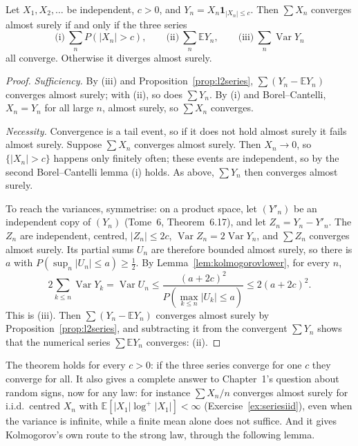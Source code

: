\begin{theorem}\label{thm:threeseries}
Let $X_1,X_2,\dots$ be independent, $c>0$, and $Y_n=X_n\mathbf 1_{|X_n|\le c}$. Then $\sum X_n$ converges almost surely if and only if the three
series
\[
\text{(i)}\ \sum_nP(|X_n|>c),\qquad\text{(ii)}\ \sum_n\mathbb E Y_n,\qquad\text{(iii)}\ \sum_n\operatorname{Var}Y_n
\]
all converge. Otherwise it diverges almost surely.
\end{theorem}
\begin{proof}
\emph{Sufficiency.} By (iii) and Proposition~\ref{prop:l2series}, $\sum(Y_n-\mathbb E Y_n)$ converges almost surely; with (ii), so does $\sum Y_n$.
By (i) and Borel--Cantelli, $X_n=Y_n$ for all large $n$, almost surely, so $\sum X_n$ converges.

\emph{Necessity.} Convergence is a tail event, so if it does not hold almost surely it fails almost surely. Suppose $\sum X_n$ converges almost surely.
Then $X_n\to0$, so $\{|X_n|>c\}$ happens only finitely often; these events are independent, so by the second Borel--Cantelli lemma (i) holds. As above,
$\sum Y_n$ then converges almost surely.

To reach the variances, symmetrise: on a product space, let $(Y'_n)$ be an independent copy of $(Y_n)$ (Tome~6, Theorem~6.17), and let
$Z_n=Y_n-Y'_n$. The $Z_n$ are independent, centred, $|Z_n|\le2c$, $\operatorname{Var}Z_n=2\operatorname{Var}Y_n$, and $\sum Z_n$ converges almost
surely. Its partial sums $U_n$ are therefore bounded almost surely, so there is $a$ with $P(\sup_n|U_n|\le a)\ge\frac12$. By
Lemma~\ref{lem:kolmogorovlower}, for every $n$,
\[
2\sum_{k\le n}\operatorname{Var}Y_k=\operatorname{Var}U_n\le\frac{(a+2c)^2}{P(\max_{k\le n}|U_k|\le a)}\le2(a+2c)^2.
\]
This is (iii). Then $\sum(Y_n-\mathbb E Y_n)$ converges almost surely by Proposition~\ref{prop:l2series}, and subtracting it from the convergent
$\sum Y_n$ shows that the numerical series $\sum\mathbb E Y_n$ converges: (ii).
\end{proof}

The theorem holds for every $c>0$: if the three series converge for one $c$ they converge for all. It also gives a complete answer to Chapter~1's
question about random signs, now for any law: for instance $\sum X_n/n$ converges almost surely for i.i.d.\ centred $X_n$ with $\mathbb E[|X_1|\log^+|X_1|]<\infty$
(Exercise~\ref{ex:seriesiid}), even when the variance is infinite, while a finite mean alone does not suffice. And it gives Kolmogorov's own route to the strong law, through the following lemma.

